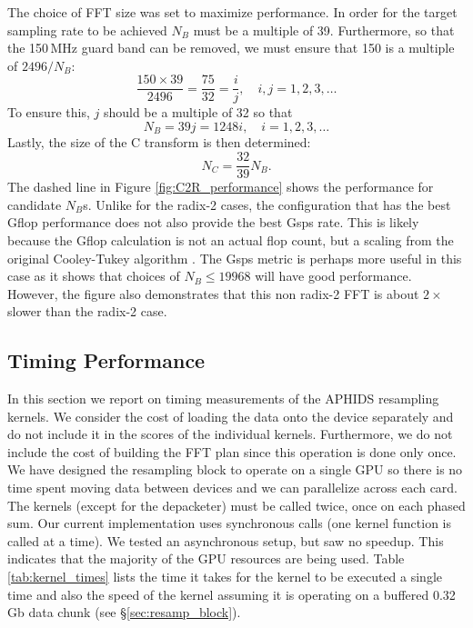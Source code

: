 The choice of FFT size was set to maximize performance.  In order for the target sampling rate to be achieved
$N_B$ must be a multiple of 39.  Furthermore, so that the 150\,MHz guard band can be removed, we must ensure that 
150 is a multiple of $2496/N_B$:
\begin{equation}
\frac{150\times39}{2496} = \frac{75}{32} = \frac{i}{j}, \quad i,j = 1, 2,3, \ldots
\end{equation}
To ensure this, $j$ should be a multiple of 32 so that 
\begin{equation}
N_B = 39j = 1248i, \quad i=1,2,3,\ldots
\end{equation}
Lastly, the size of the C transform is then determined:
\begin{equation}
N_C = \frac{32}{39} N_B.
\end{equation}
The dashed line in Figure \ref{fig:C2R_performance} shows the performance for candidate $N_B$s.  Unlike for 
the radix-2 cases, the configuration that has the best Gflop performance does not also provide the best Gsps
rate.  This is likely because the Gflop calculation is not an actual flop count, but a scaling from the 
original Cooley-Tukey algorithm \citep{cooley65}.  The Gsps metric is perhaps more useful in this case as it
shows that choices of $N_B \leq 19968$ will have good performance.  However, the figure also demonstrates
that this non radix-2 FFT is about $2\times$ slower than the radix-2 case.

\subsection{Timing Performance}

In this section we report on timing measurements of the APHIDS resampling kernels.  We consider the cost of 
loading the data onto the device separately and do not include it in the scores of the individual kernels.  
Furthermore, we do not include the cost of building the FFT plan since this operation is done only once.
We have designed the resampling block to operate on a single GPU so there is no time spent moving data 
between devices and we can parallelize across each card.  The
kernels (except for the depacketer) must be called
twice, once on each phased sum.  Our current implementation uses synchronous calls (one kernel function is 
called at a time).  We tested an asynchronous setup, but saw no speedup.  This indicates that the majority of 
the GPU resources are being used.  Table \ref{tab:kernel_times} lists the time it takes for the kernel to be 
executed a single time and also the speed of the kernel assuming it is operating on a buffered 0.32\,Gb data 
chunk (see \S\ref{sec:resamp_block}).

